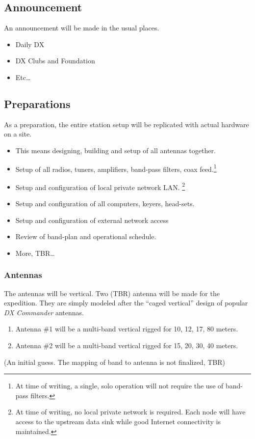 \documentclass[11pt]{article}
\begin{document}
\subsection{Announcement}

An announcement will be made in the usual places.

\begin{itemize}
\item Daily DX
\item DX Clubs and Foundation
\item Etc\ldots
\end{itemize}

\subsection{Preparations}

As a preparation, the entire station setup will be replicated with actual
hardware on a site.

\begin{itemize}
\item This means designing, building and setup of all antennas together.
\item Setup of all radios, tuners, amplifiers, band-pass filters,
coax feed.\footnote{At time of writing, a single, solo
operation will not require the use of band-pass filters.}
\item Setup and configuration of local private network LAN.
\footnote{At time of writing, no local private network is required. Each
node will have access to the upstream data sink while good Internet
connectivity is maintained.}
\item Setup and configuration of all computers, keyers, head-sets.
\item Setup and configuration of external network access
\item Review of band-plan and operational schedule.
\item More, TBR\ldots
\end{itemize}

\subsubsection{Antennas}

The antennas will be vertical.   Two (TBR) antenna will be made for
the expedition.  They are simply modeled after the ``caged vertical''
design of popular {\textit{DX Commander}} antennas.
\par
\begin{enumerate}
\item Antenna \#1 will be a multi-band vertical rigged for 10, 12, 17, 80
meters.
\item Antenna \#2 will be a multi-band vertical rigged for 15, 20, 30, 40
meters.
\end{enumerate}
\par
(An initial guess. The mapping of band to antenna is not finalized, TBR)
\par
\end{document}

